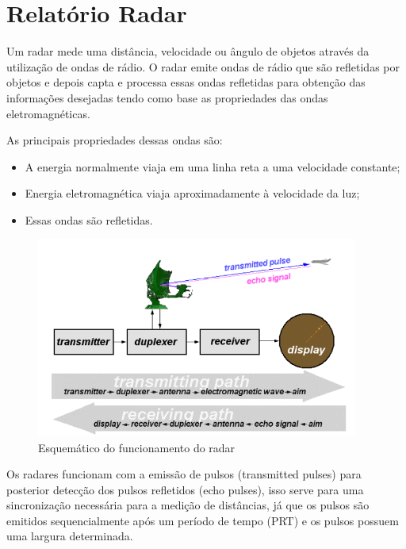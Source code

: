 \chapter[Radar]{Relatório Radar}

Um radar mede uma distância, velocidade ou ângulo de objetos através da utilização de ondas de rádio. O radar emite ondas de rádio que são refletidas por objetos e depois capta e processa essas ondas refletidas para obtenção das informações desejadas tendo como base as propriedades das ondas eletromagnéticas.

As principais propriedades dessas ondas são:

\begin{itemize}
  \item A energia normalmente viaja em uma linha reta a uma velocidade constante;
  \item Energia eletromagnética viaja aproximadamente à velocidade da luz;
  \item Essas ondas são refletidas.
\end{itemize}

\begin{figure}[h]
  \centering
  \includegraphics[width=400px, scale=1]{figuras/funcionamento_radar}
  \caption{Esquemático do funcionamento do radar}
\label{fig:funcionamento_radar}
\end{figure}

Os radares funcionam com a emissão de pulsos (transmitted pulses) para posterior detecção dos pulsos refletidos
(echo pulses), isso serve para uma sincronização necessária para a medição de distâncias, já que os pulsos
 são emitidos sequencialmente após um período de tempo (PRT) e os pulsos possuem
  uma largura determinada.

